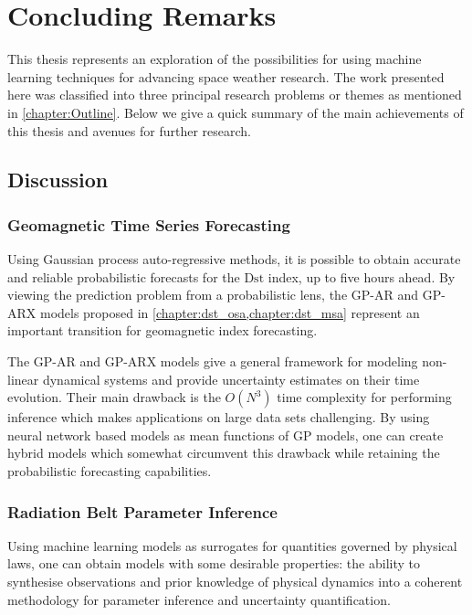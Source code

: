 \chapter{Concluding Remarks}\label{chapter:conclusions}

This thesis represents an exploration of the possibilities for using machine 
learning techniques for advancing space weather research. The work presented 
here was classified into three principal research problems or themes as 
mentioned in \cref{chapter:Outline}. Below we give a quick summary of the main 
achievements of this thesis and avenues for further research.

\section{Discussion}

\subsection*{Geomagnetic Time Series Forecasting}

Using Gaussian process auto-regressive methods, it is possible to obtain 
accurate and reliable probabilistic forecasts for the $\mathrm{Dst}$ index, 
up to five hours ahead. By viewing the prediction problem from a probabilistic 
lens, the GP-AR and GP-ARX models proposed in 
\cref{chapter:dst_osa,chapter:dst_msa} represent an important transition 
for geomagnetic index forecasting. 

The GP-AR and GP-ARX models give a general framework for modeling non-linear 
dynamical systems and provide uncertainty estimates on their time evolution. 
Their main drawback is the $O(N^3)$ time complexity for performing inference 
which makes applications on large data sets challenging. By using neural 
network based models as mean functions of GP models, one can create hybrid 
models which somewhat circumvent this drawback while retaining the 
probabilistic forecasting capabilities.

\subsection*{Radiation Belt Parameter Inference}

Using machine learning models as surrogates for quantities governed by physical 
laws, one can obtain models with some desirable properties: the ability to 
synthesise observations and prior knowledge of physical dynamics into a 
coherent methodology for parameter inference and uncertainty quantification. 

